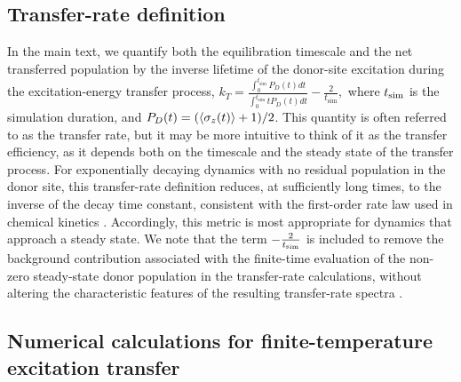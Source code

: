 \documentclass[
reprint,
superscriptaddress,

amsmath,amssymb,
aps,
prl,

floatfix,
]{revtex4-2}
\begin{document}
\subsection*{Transfer-rate definition}

In the main text, we quantify both the equilibration timescale and the net transferred population by the inverse lifetime of the donor-site excitation during the excitation-energy transfer process, $k_T=\frac{\int_{0}^{t_\text{sim}} P_D(t)dt}{\int_{0}^{t_\text{sim}} t P_D(t)dt} - \frac{2}{t_\text{sim}},$
where $t_{\rm sim}$ is the simulation duration, and $P_D(t)=(\braket{\sigma_z(t)}+1)/2$. This quantity is often referred to as the transfer rate, but it may be more intuitive to think of it as the transfer efficiency, as it depends both on the timescale and the steady state of the transfer process. For exponentially decaying dynamics with no residual population in the donor site, this transfer-rate definition reduces, at sufficiently long times, to the inverse of the decay time constant, consistent with the first-order rate law used in chemical kinetics \cite{schlawin2021electrontransfer,padilla2025delocalizedexcitationtransferopen}. Accordingly, this metric is most appropriate for dynamics that approach a steady state. We note that the term $-\frac{2}{t_{\rm sim}}$ is included to remove the background contribution associated with the finite-time evaluation of the non-zero steady-state donor population in the transfer-rate calculations, without altering the characteristic features of the resulting transfer-rate spectra \cite{so2024electrontransfer,so2025multimode}.

\subsection*{Numerical calculations for finite-temperature excitation transfer}\label{app_numeric}
\end{document}
